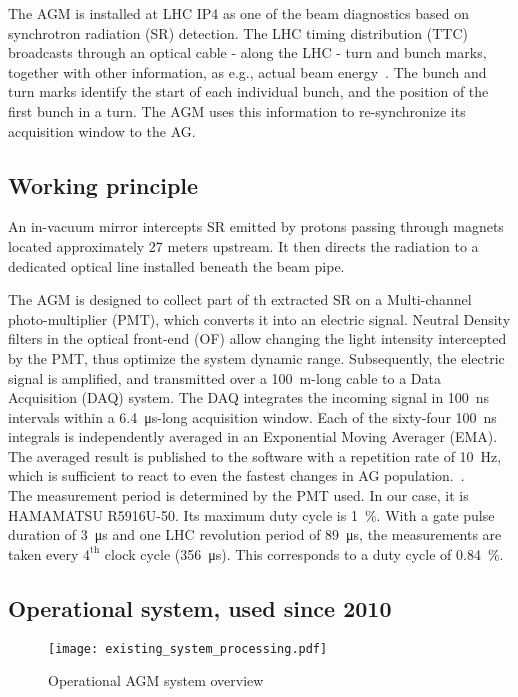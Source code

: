 %
The AGM is installed at LHC IP4 as one of the beam diagnostics based on synchrotron radiation (SR) detection. %
%
The LHC timing distribution (TTC) broadcasts through an optical cable - along the LHC - turn and bunch marks, together with other information, as e.g., actual beam energy~\cite{ttc_distribution}.
%
The bunch and turn marks identify the start of each individual bunch, and the position of the first bunch in a turn.   
%
The AGM uses this information to re-synchronize its acquisition window to the AG.
%
\subsection{Working principle}
%
An in-vacuum mirror intercepts  SR  emitted by protons passing through magnets located approximately 27 meters upstream. It then directs the radiation to a dedicated optical line installed beneath the beam pipe.

%
The AGM is designed to collect part of th extracted SR on  a Multi-channel photo-multiplier (PMT), which converts it  into an electric signal.
%
Neutral Density filters in the optical front-end (OF) allow  changing the light intensity intercepted by the PMT, thus optimize the system dynamic range.
% 
Subsequently, the electric signal is amplified, and transmitted over a \SI{100}{m}-long cable to a Data Acquisition (DAQ) system.
%
The DAQ integrates the incoming signal in \SI{100}{\nano\second} intervals within a \SI{6.4}{\micro\second}-long acquisition window.
%
Each of the sixty-four \SI{100}{\nano\second} integrals is independently averaged in an Exponential Moving Averager (EMA).
%
The averaged result is published to the software with a repetition rate of 10~Hz, which is sufficient to react to even the fastest changes in AG population.~\cite{high_sensitivity_measurement}.
%
\\
The measurement period is determined by the PMT used.
%
In our case, it is HAMAMATSU R5916U-50. 
%
Its maximum duty cycle is \SI{1}{\%}. 
%
With a gate pulse duration of \SI{3}{\micro\second} and one LHC revolution period of \SI{89}{\micro\second}, the measurements are taken every $4^{\text{th}}$ clock cycle (\SI{356}{\micro\second}).
%
This corresponds to a duty cycle of \SI{0.84}{\%}.
\\
%

\subsection{Operational system, used since 2010}
\begin{figure}[!tbh]
    \centering
    \texttt{[image: existing\_system\_processing.pdf]}
    \caption{Operational AGM system overview}
    \label{fig:current_system_processing}
\end{figure}

